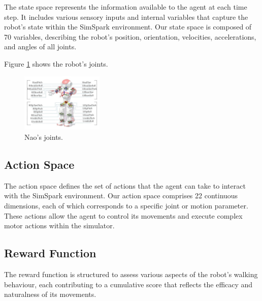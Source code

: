 \documentclass[conference]{IEEEtran}
\begin{document}
The state space represents the information available to the agent at each time step. It includes various sensory inputs and internal variables that capture the robot's state within the SimSpark environment.
Our state space is composed of 70 variables, describing the robot's position, orientation, velocities, accelerations, and angles of all joints.

Figure \ref{fig:nao-joints} shows the robot's joints.

\begin{figure}[htbp]
    \centerline{\includegraphics[width=0.35\textwidth]{images/joints.png}}
    \caption{Nao's joints.}
    \label{fig:nao-joints}
\end{figure}

\subsection{Action Space}\label{Action Space}

The action space defines the set of actions that the agent can take to interact with the SimSpark environment. Our action space comprises 22 continuous dimensions, each of which corresponds to a specific joint or motion parameter. These actions allow the agent to control its movements and execute complex motor actions within the simulator.

\subsection{Reward Function}\label{Reward Function}

The reward function is structured to assess various aspects of the robot's walking behaviour, each contributing to a cumulative score that reflects the efficacy and naturalness of its movements.
\end{document}
